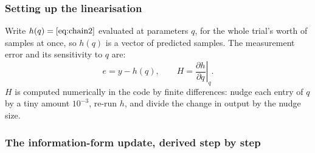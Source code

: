 \documentclass[11pt,a4paper]{article}
\begin{document}
\subsubsection{Setting up the linearisation}

Write $h(q)=\eqref{eq:chain2}$ evaluated at parameters $q$, for the whole
trial's worth of samples at once, so $h(q)$ is a vector of predicted samples.
The measurement error and its sensitivity to $q$ are:
\begin{equation}
e = y - h(q),\qquad H = \left.\frac{\partial h}{\partial q}\right|_{q}.
\label{eq:lin}
\end{equation}
$H$ is computed numerically in the code by finite differences: nudge each
entry of $q$ by a tiny amount $10^{-3}$, re-run $h$, and divide the change in
output by the nudge size.

\subsubsection{The information-form update, derived step by step}
\end{document}

